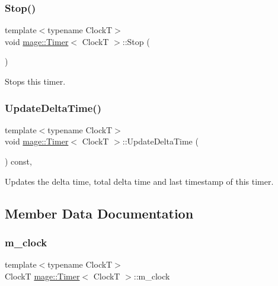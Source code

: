 \subsubsection{\texorpdfstring{Stop()}{Stop()}}
{\footnotesize\ttfamily template$<$typename ClockT$>$ \\
void \mbox{\hyperlink{classmage_1_1_timer}{mage\+::\+Timer}}$<$ ClockT $>$\+::Stop (\begin{DoxyParamCaption}{ }\end{DoxyParamCaption})\hspace{0.3cm}{\ttfamily [noexcept]}}

Stops this timer. \mbox{\label{classmage_1_1_timer_a05cbba0b368e49cdf4bfebfd840e4118}} 
\subsubsection{\texorpdfstring{Update\+Delta\+Time()}{UpdateDeltaTime()}}
{\footnotesize\ttfamily template$<$typename ClockT$>$ \\
void \mbox{\hyperlink{classmage_1_1_timer}{mage\+::\+Timer}}$<$ ClockT $>$\+::Update\+Delta\+Time (\begin{DoxyParamCaption}{ }\end{DoxyParamCaption}) const\hspace{0.3cm}{\ttfamily [private]}, {\ttfamily [noexcept]}}

Updates the delta time, total delta time and last timestamp of this timer. 

\subsection{Member Data Documentation}
\mbox{\label{classmage_1_1_timer_ad46016090f9ae8a282398d8fcc8e9e0e}} 
\subsubsection{\texorpdfstring{m\+\_\+clock}{m\_clock}}
{\footnotesize\ttfamily template$<$typename ClockT$>$ \\
ClockT \mbox{\hyperlink{classmage_1_1_timer}{mage\+::\+Timer}}$<$ ClockT $>$\+::m\+\_\+clock\hspace{0.3cm}{\ttfamily [private]}}

